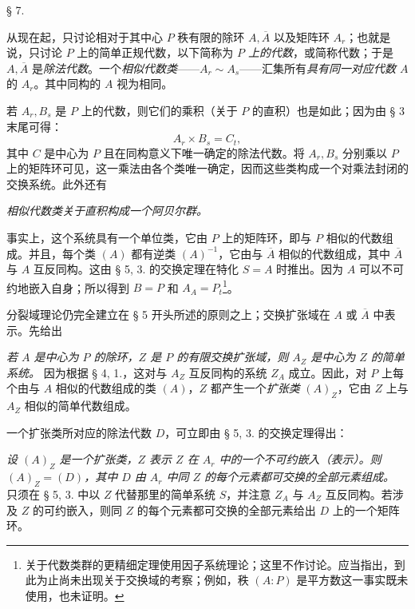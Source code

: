 \begin{center}
§ 7.

\textbf{}
\end{center}

从现在起，只讨论相对于其中心 \(P\) 秩有限的除环 \(A,\overline A\) 以及矩阵环 \(A_r\)；也就是说，只讨论 \(P\) 上的简单正规代数，以下简称为 \emph{\(P\) 上的代数}，或简称代数；于是 \(A,\overline A\) 是\emph{除法代数}。一个\emph{相似代数类}——\(A_r\sim A_s\)——汇集所有\emph{具有同一对应代数 \(A\)} 的 \(A_r\)。其中同构的 \(A\) 视为相同。

\noindent\textbf{} 若 \(A_r,B_s\) 是 \(P\) 上的代数，则它们的乘积（关于 \(P\) 的直积）也是如此；因为由 § 3 末尾可得：
\[
        A_r\times B_s=C_t,
\]
其中 \(C\) 是中心为 \(P\) 且在同构意义下唯一确定的除法代数。将 \(A_r,B_s\) 分别乘以 \(P\) 上的矩阵环可见，这一乘法由各个类唯一确定，因而这些类构成一个对乘法封闭的交换系统。此外还有

\noindent\textbf{} \emph{相似代数类关于直积构成一个阿贝尔群。}

事实上，这个系统具有一个单位类，它由 \(P\) 上的矩阵环，即与 \(P\) 相似的代数组成。并且，每个类 \((A)\) 都有逆类 \((A)^{-1}\)，它由与 \(\overline A\) 相似的代数组成，其中 \(\overline A\) 与 \(A\) 互反同构。这由 § 5, 3. 的交换定理在特化 \(S=A\) 时推出。因为 \(A\) 可以不可约地嵌入自身；所以得到 \(B=P\) 和 \(A_A=P_t\)\footnote{关于代数类群的更精细定理使用因子系统理论；这里不作讨论。应当指出，到此为止尚未出现关于交换域的考察；例如，秩 \((A:P)\) 是平方数这一事实既未使用，也未证明。}。

\noindent\textbf{}\quad 分裂域理论仍完全建立在 § 5 开头所述的原则之上；交换扩张域在 \(A\) 或 \(\overline A\) 中表示。先给出

\medskip
\noindent\textbf{} \emph{若 \(A\) 是中心为 \(P\) 的除环，\(Z\) 是 \(P\) 的有限交换扩张域，则 \(A_Z\) 是中心为 \(Z\) 的简单系统。} 因为根据 § 4, 1.，这对与 \(A_Z\) 互反同构的系统 \(Z_A\) 成立。因此，对 \(P\) 上每个由与 \(A\) 相似的代数组成的类 \((A)\)，\(Z\) 都产生一个\emph{扩张类} \((A)_Z\)，它由 \(Z\) 上与 \(A_Z\) 相似的简单代数组成。

一个扩张类所对应的除法代数 \(D\)，可立即由 § 5, 3. 的交换定理得出：

\noindent\textbf{} \emph{设 \((A)_Z\) 是一个扩张类，\(Z\) 表示 \(Z\) 在 \(A_r\) 中的一个不可约嵌入（表示）。则 \((A)_Z=(D)\)，其中 \(D\) 由 \(A_r\) 中同 \(Z\) 的每个元素都可交换的全部元素组成。} 只须在 § 5, 3. 中以 \(Z\) 代替那里的简单系统 \(S\)，并注意 \(Z_A\) 与 \(A_Z\) 互反同构。若涉及 \(Z\) 的可约嵌入，则同 \(Z\) 的每个元素都可交换的全部元素给出 \(D\) 上的一个矩阵环。

